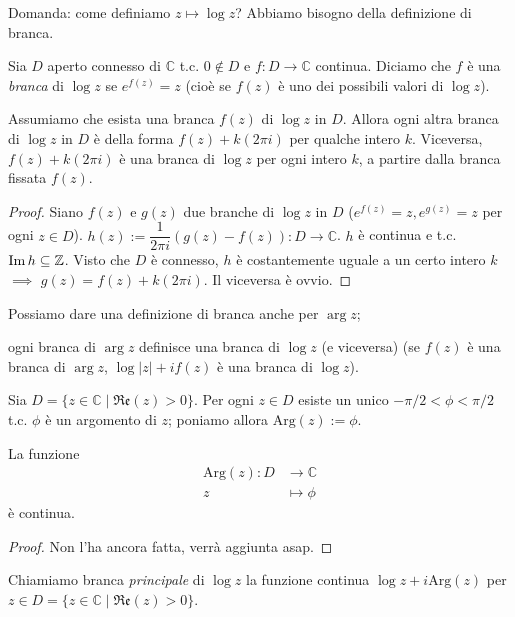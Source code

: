 Domanda: come definiamo $z \longmapsto \log{z}$? Abbiamo bisogno della definizione di branca.

\begin{defn}
  Sia $D$ aperto connesso di $\mathbb{C}$ t.c. $0 \not\in D$ e $f:D \longrightarrow \mathbb{C}$ continua. Diciamo che $f$ è una \textit{branca} di $\log{z}$ se $e^{f(z)}=z$ (cioè se $f(z)$ è uno dei possibili valori di $\log{z}$).
\end{defn}

\begin{prop}
  Assumiamo che esista una branca $f(z)$ di $\log{z}$ in $D$. Allora ogni altra branca di $\log{z}$ in $D$ è della forma $f(z)+k(2\pi i)$ per qualche intero $k$. Viceversa, $f(z)+k(2 \pi i)$ è una branca di $\log{z}$ per ogni intero $k$, a partire dalla branca fissata $f(z)$.
\end{prop}

\begin{proof}
  Siano $f(z)$ e $g(z)$ due branche di $\log{z}$ in $D$ ($e^{f(z)}=z, e^{g(z)}=z$ per ogni $z \in D$). $h(z):=\dfrac{1}{2\pi i}(g(z)-f(z)):D \longrightarrow \mathbb{C}$. $h$ è continua e t.c. $\operatorname{Im}{h} \subseteq \mathbb{Z}$.
  Visto che $D$ è connesso, $h$ è costantemente uguale a un certo intero $k$ $\implies$ $g(z)=f(z)+k(2\pi i)$. Il viceversa è ovvio.
\end{proof}

\begin{oss}
  \begin{nlist}
    \item Possiamo dare una definizione di branca anche per $\arg{z}$;
    \item ogni branca di $\arg{z}$ definisce una branca di $\log{z}$ (e viceversa) (se $f(z)$ è una branca di $\arg{z}$, $\log{|z|}+if(z)$ è una branca di $\log{z}$).
  \end{nlist}
\end{oss}

\begin{oss}
  Sia $D=\{z \in \mathbb{C} \mid \mathfrak{Re}(z)>0\}$. Per ogni $z \in D$ esiste un unico $-\pi/2<\phi<\pi/2$ t.c. $\phi$ è un argomento di $z$; poniamo allora $\text{Arg}(z):=\phi$.
\end{oss}

\begin{prop}
  La funzione
  \begin{align*}
    \text{Arg}(z):D &\longrightarrow \mathbb{C}\\
    z &\longmapsto \phi
  \end{align*}
  è continua.
\end{prop}

\begin{proof}
  Non l'ha ancora fatta, verrà aggiunta asap.
\end{proof}

\begin{defn}
  Chiamiamo branca \textit{principale} di $\log{z}$ la funzione continua $\log{z}+i\text{Arg}(z)$ per $z \in D=\{z \in \mathbb{C} \mid \mathfrak{Re}(z)>0\}$.
\end{defn}
